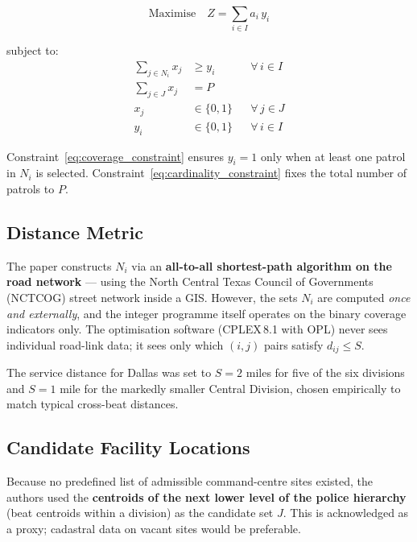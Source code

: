 \documentclass[12pt]{article}
\begin{document}
\begin{equation}
    \text{Maximise} \quad Z = \sum_{i \in I} a_i \, y_i
    \label{eq:ppac_obj}
\end{equation}

\noindent subject to:
\begin{align}
    \sum_{j \in N_i} x_j &\ge y_i  && \forall\, i \in I
        \label{eq:coverage_constraint}\\
    \sum_{j \in J} x_j   &= P
        \label{eq:cardinality_constraint}\\
    x_j &\in \{0,1\}               && \forall\, j \in J
        \label{eq:binary_x}\\
    y_i &\in \{0,1\}               && \forall\, i \in I
        \label{eq:binary_y}
\end{align}

Constraint~\eqref{eq:coverage_constraint} ensures $y_i=1$ only when at least
one patrol in $N_i$ is selected.  Constraint~\eqref{eq:cardinality_constraint}
fixes the total number of patrols to $P$.

\subsection{Distance Metric}

The paper constructs $N_i$ via an \textbf{all-to-all shortest-path algorithm
on the road network} --- using the North Central Texas Council of Governments
(NCTCOG) street network inside a GIS.  However, the sets $N_i$ are computed
\emph{once and externally}, and the integer programme itself operates on the
binary coverage indicators only.  The optimisation software (CPLEX\,8.1 with
OPL) never sees individual road-link data; it sees only which
$(i,j)$ pairs satisfy $d_{ij} \le S$.

The service distance for Dallas was set to $S = 2$ miles for five of the six
divisions and $S = 1$ mile for the markedly smaller Central Division, chosen
empirically to match typical cross-beat distances.

\subsection{Candidate Facility Locations}

Because no predefined list of admissible command-centre sites existed, the
authors used the \textbf{centroids of the next lower level of the police
hierarchy} (beat centroids within a division) as the candidate set $J$.  This
is acknowledged as a proxy; cadastral data on vacant sites would be preferable.
\end{document}
